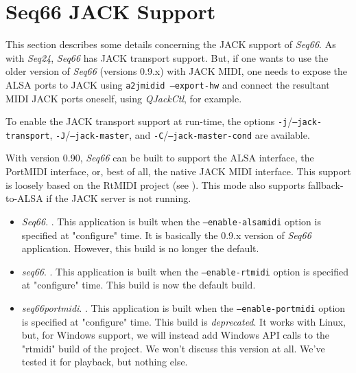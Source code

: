 %
%
%

\section{Seq66 JACK Support}
\label{sec:jack}

   This section describes some details concerning the JACK support of
   \textsl{Seq66}.
   As with \textsl{Seq24}, \textsl{Seq66} has JACK transport support.
   But, if one wants to use the older version of \textsl{Seq66} (versions
   0.9.x) with JACK MIDI, one needs to expose the ALSA ports to JACK using
   \texttt{a2jmidid --export-hw} and connect the resultant MIDI JACK ports
   oneself, using \textsl{QJackCtl}, for example.

   To enable the JACK transport support at run-time, the options
   \texttt{-j}/\texttt{--jack-transport}, \texttt{-J}/\texttt{--jack-master},
   and \texttt{-C}/\texttt{--jack-master-cond} are available.

   With version 0.90, \textsl{Seq66} can be built to support the
   ALSA interface, the PortMIDI interface, or, best of all, the native JACK
   MIDI interface.
   This support is loosely based on the RtMIDI project
   (see \cite{rtmidi}).
   This mode also supports fallback-to-ALSA if the JACK
   server is not running.

   \begin{itemize}
      \item \textsl{Seq66}.
         .
         This application is built when the
         \texttt{--enable-alsamidi} option is specified at "configure" time.
         It is basically the 0.9.x version of \textsl{Seq66} application.
         However, this build is no longer the default.
      \item \textsl{seq66}.
         .
         This application is built when the
         \texttt{--enable-rtmidi} option is specified at "configure" time.
         This build is now the default build.
      \item \textsl{seq66portmidi}.
         .
         This application is built when the
         \texttt{--enable-portmidi} option is specified at "configure" time.
         This build is \textsl{deprecated}.  It works with Linux, but, for
         Windows support, we will instead add Windows API calls to the "rtmidi"
         build of the project.  We won't discuss this version at all.  We've
         tested it for playback, but nothing else.
   \end{itemize}

